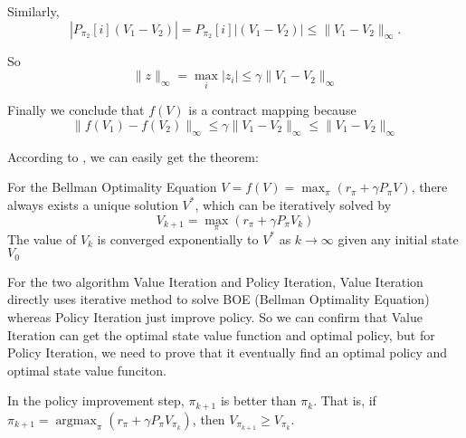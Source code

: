 Similarly,
\begin{equation*}
	|P_{\pi_{2}}[i](V_{1}-V_{2})|=P_{\pi_{2}}[i]|(V_{1}-V_{2})|\le\|V_{1}-V_{2}\|_{\infty}.
\end{equation*}

So
\begin{equation*}
	\|z\|_{\infty}=\max_{i}|z_{i}|\le\gamma\|V_{1}-V_{2}\|_{\infty}
\end{equation*}

Finally we conclude that $f(V)$ is a contract mapping because
\begin{equation*}
	\|f(V_{1})-f(V_{2})\|_{\infty}\le\gamma\|V_{1}-V_{2}\|_{\infty}\le\|V_{1}-V_{2}\|_{\infty}
\end{equation*}

According to , we can easily get the theorem:
\begin{theorem}
	For the Bellman Optimality Equation $V=f(V)=\max_{\pi}(r_{\pi}+\gamma P_{\pi}V)$, there always exists a unique solution $V^*$, which can be iteratively solved by
	\begin{equation}
		V_{k+1}=\max_{\pi}(r_{\pi}+\gamma P_{\pi}V_{k})
	\end{equation}
	The value of $V_{k}$ is converged exponentially to $V^*$ as $k\to \infty$ given any initial state $V_{0}$
\end{theorem}

For the two algorithm Value Iteration and Policy Iteration, Value Iteration directly uses iterative method to solve BOE (Bellman Optimality
Equation) whereas Policy Iteration just improve policy. So we can confirm that Value Iteration can get the optimal state value function and
optimal policy, but for Policy Iteration, we need to prove that it eventually find an optimal policy and optimal state value funciton.

\begin{lemma}\label{lem:policy-improve}
	In the policy improvement step, $\pi_{k+1}$ is better than $\pi_{k}$. That is, if $\pi_{k+1}=\mathop{\arg\max}_{\pi}(r_{\pi}+\gamma P_{\pi}V_{\pi_{k}})$, then $V_{\pi_{k+1}} \ge V_{\pi_{k}}$.
\end{lemma}

